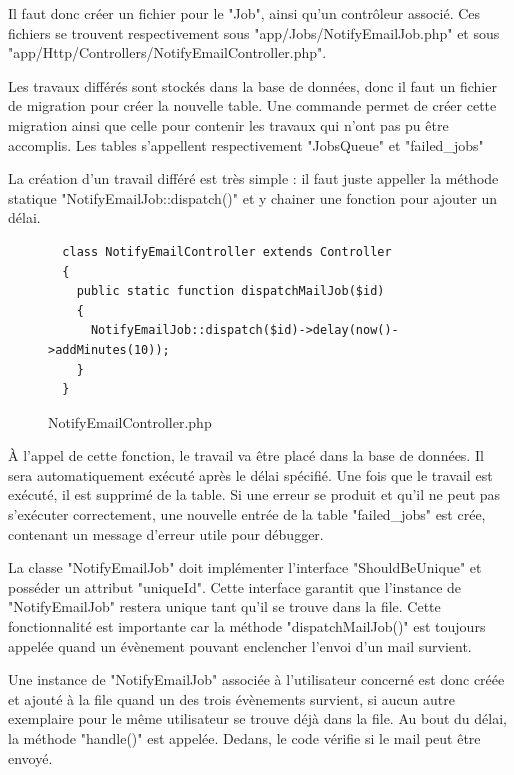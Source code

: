 \documentclass[
    iai, %
    eai, %
]{heig-tb}
\begin{document}
Il faut donc créer un fichier pour le "Job", ainsi qu'un contrôleur associé. Ces fichiers se trouvent respectivement sous "app/Jobs/NotifyEmailJob.php" et sous "app/Http/Controllers/NotifyEmailController.php".

Les travaux différés sont stockés dans la base de données, donc il faut un fichier de migration pour créer la nouvelle table.
Une commande permet de créer cette migration ainsi que celle pour contenir les travaux qui n'ont pas pu être accomplis. Les tables s'appellent respectivement "JobsQueue" et "failed\_jobs"

La création d'un travail différé est très simple : il faut juste appeller la méthode statique "NotifyEmailJob::dispatch()" et y chainer une fonction pour ajouter un délai.

\begin{figure}[h]
  \begin{verbatim}
  class NotifyEmailController extends Controller
  {
    public static function dispatchMailJob($id)
    {
      NotifyEmailJob::dispatch($id)->delay(now()->addMinutes(10));
    }
  }
  \end{verbatim}
  \caption{NotifyEmailController.php}
\end{figure}

À l'appel de cette fonction, le travail va être placé dans la base de données. Il sera automatiquement exécuté après le délai spécifié. Une fois que le travail est exécuté, il est supprimé de la table. Si une erreur se produit et qu'il ne peut pas s'exécuter correctement, une nouvelle entrée de la table "failed\_jobs" est crée, contenant un message d'erreur utile pour débugger.

La classe "NotifyEmailJob" doit implémenter l'interface "ShouldBeUnique" et posséder un attribut "uniqueId". Cette interface garantit que l'instance de "NotifyEmailJob" restera unique tant qu'il se trouve dans la file. Cette fonctionnalité est importante car la méthode "dispatchMailJob()" est toujours appelée quand un évènement pouvant enclencher l'envoi d'un mail survient.

\newpage
Une instance de "NotifyEmailJob" associée à l'utilisateur concerné est donc créée et ajouté à la file quand un des trois évènements survient, si aucun autre exemplaire pour le même utilisateur se trouve déjà dans la file. Au bout du délai, la méthode "handle()" est appelée. Dedans, le code vérifie si le mail peut être envoyé.
\end{document}
